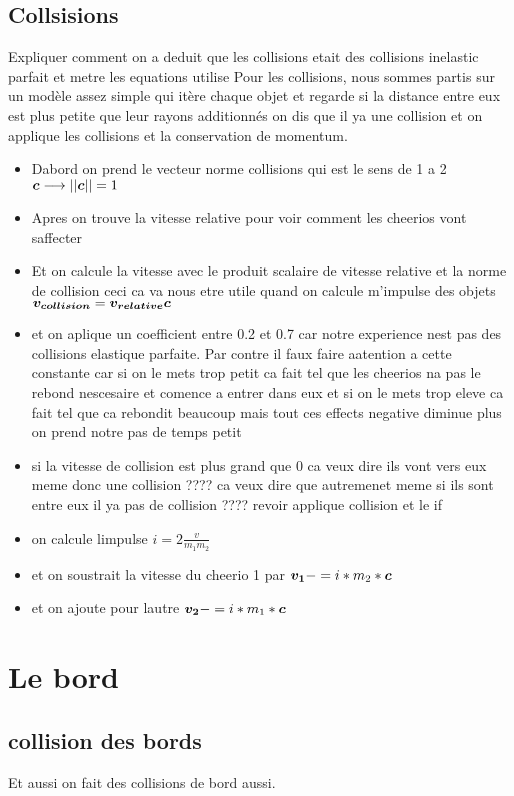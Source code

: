 \documentclass[a4paper, 11pt, oneside]{article} %
\begin{document}
    \subsection{Collsisions}
    Expliquer comment on a deduit que les collisions etait des collisions inelastic parfait et metre les equations utilise
    Pour les collisions, nous sommes partis sur un modèle assez simple qui itère chaque objet et regarde si la distance entre eux est plus petite que leur rayons additionnés on dis que il ya une collision et on applique les collisions et la conservation de momentum.
    \begin{itemize}
        \item Dabord on prend le vecteur norme collisions qui est le sens de 1 a 2 $\vb*{c} \longrightarrow ||\vb*{c}|| = 1$ 
        \item Apres on trouve la vitesse relative pour voir comment les cheerios vont saffecter
        \item Et on calcule la vitesse avec le produit scalaire de vitesse relative et la norme de collision ceci ca va nous etre utile quand on calcule m'impulse des objets $\vb*{v_{collision}}=\vb*{v_{relative}}\vb*{c} $
        \item et on aplique un coefficient entre 0.2 et 0.7 car notre experience nest pas des collisions elastique parfaite. Par contre il faux faire aatention a cette constante car si on le mets trop petit ca fait tel que les cheerios na pas le rebond nescesaire et comence a entrer dans eux et si on le mets trop eleve ca fait tel que ca rebondit beaucoup mais tout ces effects negative diminue plus on prend notre pas de temps petit
        \item si la vitesse de collision est plus grand que 0 ca veux dire ils vont vers eux meme donc une collision ???? ca veux dire que autremenet meme si ils sont entre eux il ya pas de collision ???? revoir applique collision et le if
        \item on calcule limpulse $i = 2\frac{v}{m_1 m_2}$
        \item et on soustrait la vitesse du cheerio 1 par $\vb*{v_1} -= i*m_2*\vb*{c}$
        \item et on ajoute pour lautre $\vb*{v_2} -= i*m_1*\vb*{c}$
    \end{itemize} 
    \section{Le bord}
    \subsection{collision des bords}
    Et aussi on fait des collisions de bord aussi.
\end{document}
